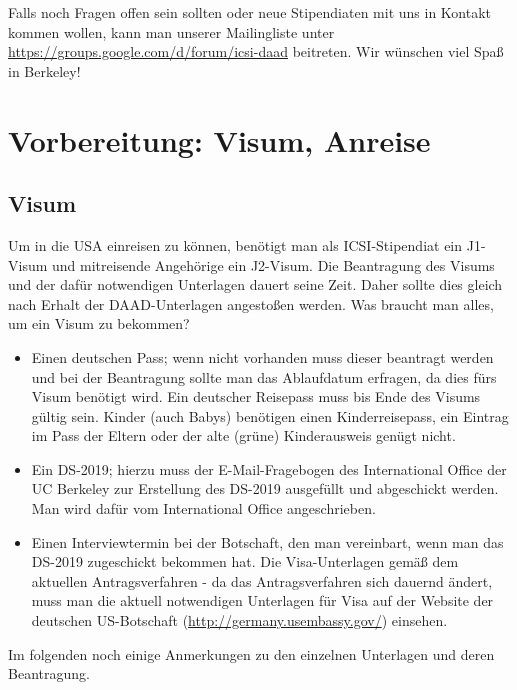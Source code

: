 \documentclass[a4paper]{scrreprt}
\begin{document}
Falls noch Fragen offen sein sollten oder neue Stipendiaten mit uns in Kontakt kommen wollen,
kann man unserer Mailingliste unter \url{https://groups.google.com/d/forum/icsi-daad} beitreten.
Wir wünschen viel Spaß in Berkeley!

\tableofcontents
 
\chapter{Vorbereitung: Visum, Anreise}

\section{Visum}

Um in die USA einreisen zu können, benötigt man als ICSI-Stipendiat ein J1-Visum und mitreisende Angehörige ein J2-Visum. Die Beantragung des Visums und der dafür notwendigen Unterlagen dauert seine Zeit. Daher sollte dies gleich nach Erhalt der DAAD-Unterlagen angestoßen werden. Was braucht man alles, um ein Visum zu bekommen?

\begin{itemize}

  \item Einen deutschen Pass; wenn nicht vorhanden muss dieser beantragt werden und bei der Beantragung sollte man das Ablaufdatum erfragen, da dies fürs Visum benötigt wird. Ein deutscher Reisepass muss bis Ende des Visums gültig sein. Kinder (auch Babys) benötigen einen Kinderreisepass, ein Eintrag im Pass der Eltern oder der alte (grüne) Kinderausweis genügt nicht.

	\item Ein DS-2019; hierzu muss der E-Mail-Fragebogen des International Office der UC Berkeley zur Erstellung des DS-2019 ausgefüllt und abgeschickt werden. Man wird dafür vom International Office angeschrieben.
	
	\item Einen Interviewtermin bei der Botschaft, den man vereinbart, wenn man das DS-2019 zugeschickt bekommen hat. Die Visa-Unterlagen gemäß dem aktuellen Antragsverfahren - da das Antragsverfahren sich dauernd ändert, muss man die aktuell notwendigen Unterlagen für Visa auf der Website der deutschen US-Botschaft (\url{http://germany.usembassy.gov/}) einsehen.

\end{itemize}

Im folgenden noch einige Anmerkungen zu den einzelnen Unterlagen und deren Beantragung.
\end{document}
